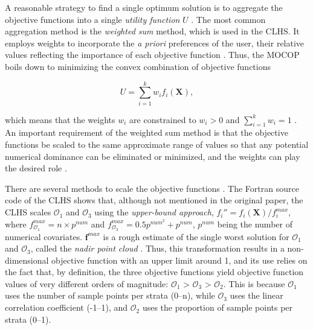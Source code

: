 A reasonable strategy to find a single optimum solution is to aggregate the objective functions into a single 
\emph{utility function} $U$ \cite{MarlerEtAl2005}. The most common aggregation method is the \emph{weighted 
sum} method, which is used in the CLHS. It employs weights to incorporate the \emph{a priori} preferences of 
the user, their relative values reflecting the importance of each objective function \cite{MarlerEtAl2009}. 
Thus, the MOCOP boils down to minimizing the convex combination of objective functions

\begin{equation}
 U = \sum_{i=1}^{k} w_i f_i(\boldsymbol{X}),
\end{equation}\label{eq:chap07-utility}

\noindent which means that the weights $w_i$ are constrained to $w_i > 0$ and $\sum_{i=1}^{k} w_i = 1$ 
\cite{MarlerEtAl2005, MarlerEtAl2009}. An important requirement of the weighted sum method is that the 
objective functions be scaled to the same approximate range of values so that any potential numerical 
dominance can be eliminated or minimized, and the weights can play the desired role \cite{MarlerEtAl2005, 
MarlerEtAl2009}. 

There are several methods to scale the objective functions \cite{MarlerEtAl2005}. The Fortran source code of 
the CLHS shows that, although not mentioned in the original paper, the CLHS scales $\mathcal{O}_1$ and 
$\mathcal{O}_3$ using the \emph{upper-bound approach}, $f_i'' =f_i(\boldsymbol{X}) / f_i^{max}$, where 
$f^{max}_{\mathcal{O}_1} = n \times p^{num}$ and $f^{max}_{\mathcal{O}_3} = 0.5p^{num^2} + p^{num}$, 
$p^{num}$ being the number of numerical covariates. $\boldsymbol{f}^{max}$ is a rough estimate of the 
single worst solution for $\mathcal{O}_1$ and $\mathcal{O}_3$, called the \emph{nadir point cloud} 
\cite{MarlerEtAl2004}. Thus, this transformation results in a non-dimensional objective function with an upper 
limit around 1, and its use relies on the fact that, by definition, the three objective functions yield 
objective function values of very different orders of magnitude: $\mathcal{O}_1$ > $\mathcal{O}_3$ > 
$\mathcal{O}_2$. This is because $\mathcal{O}_1$ uses the number of sample points per strata (0--n), while 
$\mathcal{O}_3$ uses the linear correlation coefficient (-1--1), and $\mathcal{O}_2$ uses the proportion of 
sample points per strata (0--1).

